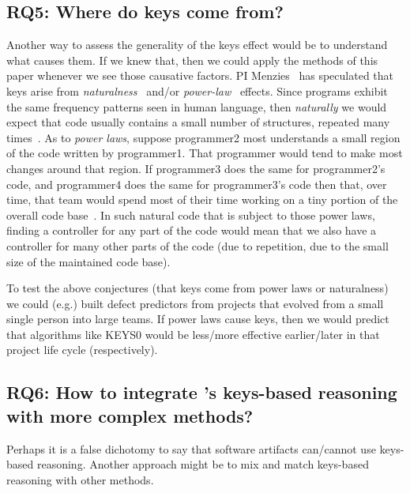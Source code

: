 \subsection{RQ5:  Where do keys come from?}
Another way  to assess the generality of the keys effect would be to understand what causes them. If we knew that,
 then we could apply the methods  of this paper whenever we see  those causative factors. 
 PI Menzies~\cite{Menzies21}  has speculated 
that  keys arise from  {\em naturalness}~\cite{hindle16}
and/or {\em power-law}~\cite{lin15}  effects. Since programs exhibit the same frequency patterns  seen in human language,  then  {\em  naturally} we would  expect that code usually contains a small number of structures,  repeated many times~\cite{hindle16}.  As to {\em power laws}, suppose programmer2  most understands a small region  of the code written by programmer1.
That programmer  would tend to make  most changes around  that region.  If programmer3 does  the  same  for  programmer2's code,  and  programmer4 does the same for programmer3's code then that, over time, that team would  spend most
of
 their time working on a tiny portion of the overall code base~\cite{lin15}.
 In  such natural code that is  subject
 to  those  power laws, finding a controller for any part of the code  would mean that we also have a controller  for  many other  parts of the code (due to  repetition, due to the small
 size of  the  maintained code  base). 
 
 
To test the above conjectures (that keys come from power laws or naturalness) we could (e.g.)
 built defect predictors from projects that evolved from a small single person into large teams. If power laws cause keys,
 then we would predict that algorithms like KEYS0 would be less/more effective earlier/later in that project life cycle (respectively).
 
 
 
\subsection{RQ6:   How to integrate  {\IT}'s keys-based reasoning with more complex methods?}\label{pm}

Perhaps it is a false dichotomy to say that software artifacts
can/cannot use keys-based reasoning. Another approach might be to   mix and match keys-based reasoning with other methods.


